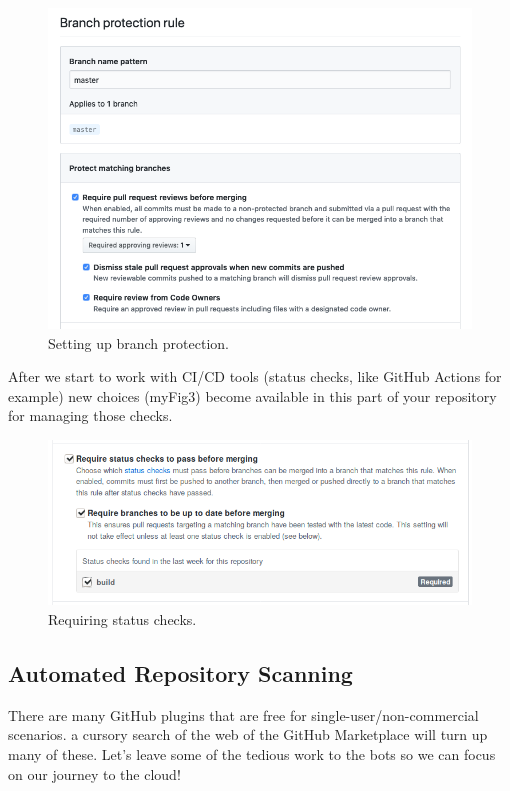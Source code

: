 \begin{figure}
\includegraphics[scale=0.50]{../images/github-branch-protection.png}
\caption{Setting up branch protection.}
\end{figure}

\justify
After we start to work with CI/CD tools (status checks, like GitHub
Actions for example) new choices ({myFig3}) become available in this
part of your repository for managing those checks.

\begin{figure}
\includegraphics[scale=0.53]{../images/guthub-status-check.png}
\caption{Requiring status checks.}
\end{figure}

\subsection{Automated Repository Scanning}

\justify
There are many GitHub plugins that are free for
single-user/non-commercial scenarios. a cursory search of the web of the
GitHub Marketplace will turn up many of these. Let's leave some of the
tedious work to the bots so we can focus on our journey to the cloud!


